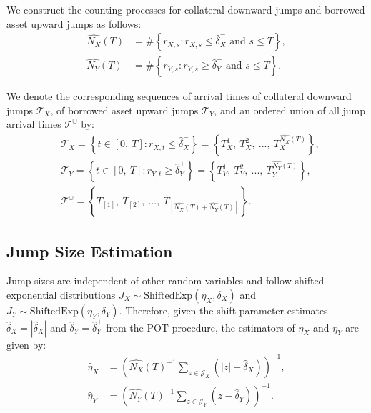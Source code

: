 \documentclass{article}
\theoremstyle{definition}
\begin{document}
We construct the counting processes for collateral downward jumps and borrowed asset upward jumps as follows:
\begin{equation}
   \begin{split}
   \widehat{N_X}(T) &= \#\left\{
       r_{X,s}: r_{X,s} \leq \widehat\delta_X^- \text{ and } s \leq T
       \right\}, \\ 
   \widehat{N_Y}(T) &= \#\left\{
       r_{Y,s}: r_{Y,s} \geq \widehat\delta_Y^+ \text{ and } s \leq T
       \right\}.
   \end{split}
\end{equation}

We denote the corresponding sequences of arrival times of collateral downward jumps $\mathcal{T}_X$, of borrowed asset upward jumps $\mathcal{T}_Y$, and an ordered union of all jump arrival times $\mathcal{T}^{\cup}$ by:
\begin{equation}
   \begin{split}
& \mathcal{T}_X = \left\{t \in [0,\ T]: r_{X,t} \leq \widehat\delta_X^- \right\} = \left\{T_X^1,\ T_X^2,\ ...,\ T_X^{\widehat{N_X}(T)}\right\},\\
& \mathcal{T}_Y = \left\{t \in [0,\ T]: r_{Y,t} \geq \widehat\delta_Y^+ \right\} = \left\{T_Y^1,\ T_Y^2,\ ...,\ T_Y^{\widehat{N_Y}(T)}\right\},\\
& \mathcal{T}^{\cup} = \left\{T_{[1]},\ T_{[2]},\ ...,\ T_{[\widehat{N_X}(T)+\widehat{N_Y}(T)]}\right\}.
   \end{split}
\end{equation}

\subsection{Jump Size Estimation}

Jump sizes are independent of other random variables and follow shifted exponential distributions $J_X \sim \text{ShiftedExp}(\eta_X, \delta_X)$ and $J_Y \sim \text{ShiftedExp}(\eta_Y, \delta_Y)$. 
Therefore, given the shift parameter estimates $\widehat \delta_X = |\widehat \delta_X^-|$ and $\widehat \delta_Y = \widehat \delta_Y^+$ from the POT procedure, the estimators of $\eta_X$ and $\eta_Y$ are given by:
\begin{equation}\label{eq:mean_p_jumps_sizes}
   \begin{split}
\widehat \eta_X &= \left(\widehat{N_X}(T)^{-1} \sum_{z \in \mathcal{J}_X}\left(|z| - \widehat \delta_X\right)\right)^{-1},\\
\widehat \eta_Y &= \left(\widehat{N_Y}(T)^{-1} \sum_{z \in \mathcal{J}_Y}\left(z - \widehat \delta_Y\right)\right)^{-1}. 
   \end{split}
\end{equation}
\end{document}
